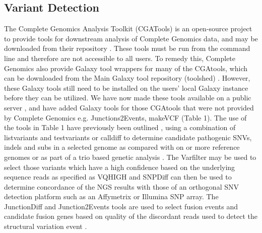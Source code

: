 \documentclass[10pt]{bmc_article}
\newenvironment{bmcformat}{\begin{raggedright}\baselineskip20pt\sloppy\setboolean{publ}{false}}{\end{raggedright}\baselineskip20pt\sloppy}
\begin{document}
\begin{bmcformat}
\subsection*{Variant Detection}
The Complete Genomics Analysis Toolkit (CGATools) is an open-source project to provide tools for downstream analysis of Complete Genomics data, and may be downloaded from their repository \cite{url-cgatools}. These tools must be run from the command line and therefore are not accessible to all users. To remedy this, Complete Genomics also provide Galaxy tool wrappers for many of the CGAtools, which can be downloaded from the Main Galaxy tool repository (toolshed) \cite{url-toolshed}. However, these Galaxy tools still need to be installed on the users’ local Galaxy instance before they can be utilized. We have now made these tools available on a public server \cite{url-nbicgalaxy}, and have added Galaxy tools for those CGAtools that were not provided by Complete Genomics e.g. Junctions2Events, makeVCF (Table 1).  The use of the tools in Table 1 have previously been outlined \cite{nieminen}, using a combination of listvariants and testvariants or calldiff to determine candidate pathogenic SNVs, indels and subs in a selected genome as compared with on or more reference genomes or as part of a trio based genetic analysis \cite{nieminen}.  The Varfilter may be used to select those variants which have a high confidence based on the underlying sequence reads as specified as VQHIGH and SNPDiff can then be used to determine concordance of the NGS results with those of an orthogonal SNV detection platform such as an Affymetrix or Illumina SNP array.  The JunctionDiff and Junction2Events tools are used to select fusion events and candidate fusion genes based on quality of the discordant reads used to detect the structural variation event \cite{ifuse}.


\end{bmcformat}
\end{document}
